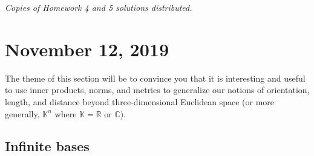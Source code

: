 \documentclass[11pt]{article}
\newcommand{\R}{\ensuremath{\mathbb R}}
\newcommand{\C}{\ensuremath{\mathbb C}}
\newcommand{\K}{\ensuremath{\mathbb K}}
\theoremstyle{plain}
\theoremstyle{definition}
\theoremstyle{remark}
\begin{document}
{\it Copies of Homework 4 and 5 solutions distributed.}

\section{November 12, 2019}

The theme of this section will be to convince you that it is interesting and useful to use inner products, norms, and metrics to generalize our notions of orientation, length, and distance beyond three-dimensional Euclidean space (or more generally, $\K^n$ where $\K = \R$ or $\C$).

\subsection{Infinite bases}
\end{document}
